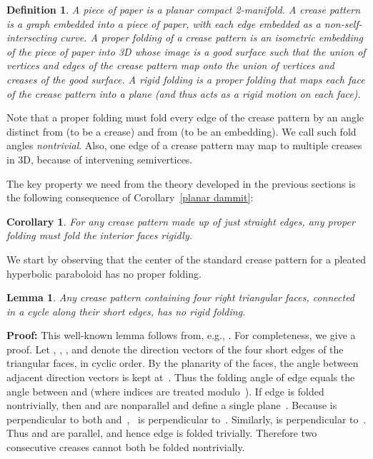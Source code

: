 \documentclass[11pt,letterpaper]{article}
\newtheorem{lemma}[theorem]{Lemma}
\newtheorem{corollary}[theorem]{Corollary}
\newtheorem{definition}{Definition}
\newenvironment{proof}{\noindent\textbf{Proof: }\ignorespaces}
  {\hspace*{\fill}\medskip}
\newcommand\term[1]{\emph{#1}}
\begin{document}
\begin{definition}
  A \term{piece of paper} is a planar compact 2-manifold.
  A \term{crease pattern} is a graph embedded into a piece of paper,
  with each edge embedded as a non-self-intersecting curve.
  A \term{proper folding} of a crease pattern is an isometric embedding
  of the piece of paper into 3D whose image is a good surface such that
  the union of vertices and edges of the crease pattern map onto
  the union of vertices and creases of the good surface.
  A \term{rigid folding} is a proper folding that maps each face of the
  crease pattern into a plane (and thus acts as a rigid motion on each face).
\end{definition}

Note that a proper folding must fold every edge of the crease pattern
by an angle distinct from  (to be a crease) and from 
(to be an embedding).  We call such fold angles \term{nontrivial}.
Also, one edge of a crease pattern may map to multiple creases in 3D,
because of intervening semivertices.

The key property we need from the theory developed in the previous sections
is the following consequence of Corollary~\ref{planar dammit}:

\begin{corollary} \label{interior rigid}
  For any crease pattern made up of just straight edges,
  any proper folding must fold the interior faces rigidly.
\end{corollary}

We start by observing that the center of the standard crease pattern
for a pleated hyperbolic paraboloid has no proper folding.

\begin{lemma} \label{four triangles}
  Any crease pattern containing four right triangular faces,
  connected in a cycle along their short edges,
  has no rigid folding.
\end{lemma}

\begin{proof}
  This well-known lemma follows from,
  e.g., \cite[Lemma~9]{Donoso-O'Rourke-2002}.
  For completeness, we give a proof.
  Let , , , and  denote the direction vectors
  of the four short edges of the triangular faces, in cyclic order.
  By the planarity of the faces,
  the angle between adjacent direction vectors is kept at~.
  Thus the folding angle of edge  equals the angle
  between  and  (where indices are treated modulo~).
  If edge  is folded nontrivially, then
   and  are nonparallel and define a single plane~.
  Because  is perpendicular to both  and~,
  ~is perpendicular to~.
  Similarly,  is perpendicular to~.
  Thus  and  are parallel,
  and hence edge  is folded trivially.
  Therefore two consecutive creases cannot both be folded nontrivially.
\end{proof}
\end{document}

